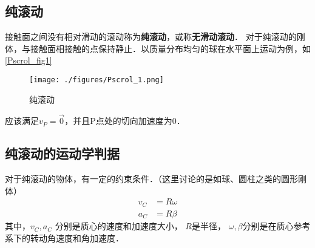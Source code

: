 

\begin{issues}
\issueDraft
\issueTODO
\end{issues}

\subsection{纯滚动}
接触面之间没有相对滑动的滚动称为\textbf{纯滚动}，或称\textbf{无滑动滚动}．
对于纯滚动的刚体，与接触面相接触的点保持静止．以质量分布均匀的球在水平面上运动为例，如\autoref{Pscrol_fig1}
\begin{figure}[ht]
\centering
\texttt{[image: ./figures/Pscrol\_1.png]}
\caption{纯滚动} \label{Pscrol_fig1}
\end{figure}
应该满足$v_P=\vec 0$，并且P点处的切向加速度为0．

\subsection{纯滚动的运动学判据}
对于纯滚动的物体，有一定的约束条件．（这里讨论的是如球、圆柱之类的圆形刚体）
\begin{align}
v_C&=R\omega\\
a_C&=R\beta
\end{align}
其中，$v_C,a_C$
分别是质心的速度和加速度大小，
$R$是半径，
$\omega,\beta$分别是在质心参考系下的转动角速度和角加速度．